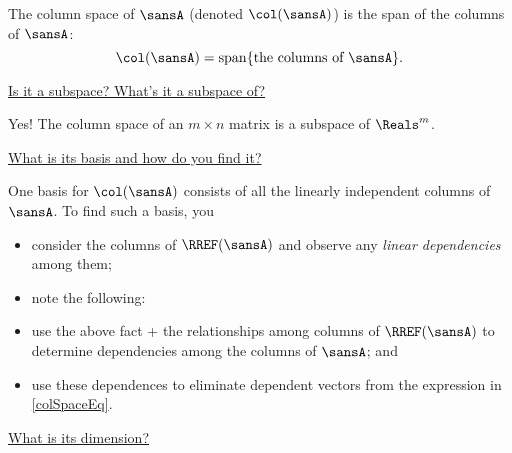 \documentclass[12 pt]{article}
\begin{document}
The column space of $\sansA$ (denoted $\col(\sansA)$) is the span of the columns of $\sansA$:
\begin{equation}
	\label{colSpaceEq}
	\col(\sansA)=\vsspan\{\text{the columns of $\sansA$}\}.
\end{equation}

\vspace{1.5mm}

\noindent\ul{Is it a subspace? What's it a subspace of?} 

Yes! The column space of an $m\times n$ matrix is a subspace of $\Reals^m$. 

\vspace{6mm}

\noindent\ul{What is its basis and how do you find it?}

One basis for $\col(\sansA)$ consists of all the linearly independent columns of $\sansA$. To find such a basis, you 
\begin{itemize}
	\item consider the columns of $\RREF(\sansA)$ and observe any \textit{linear dependencies} among them;
	
	\item note the following:
	
	
	\item use the above fact + the relationships among columns of $\RREF(\sansA)$ to determine dependencies among the columns of $\sansA$; and
	
	\item use these dependences to eliminate dependent vectors from the expression in \eqref{colSpaceEq}.
\end{itemize}

\vspace{3mm}


\vspace{6mm}

\noindent\ul{What is its dimension?}
\end{document}

